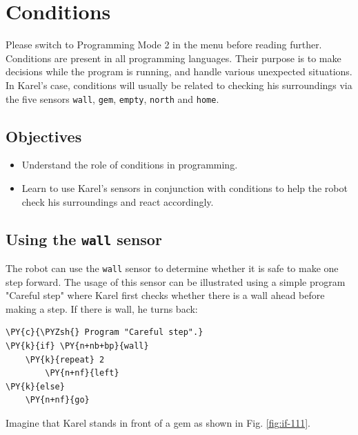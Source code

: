 
\section{Conditions} \label{sec:cond}

Please switch to Programming Mode 2 in the menu before reading further. Conditions 
are present in all programming languages. Their purpose is to make decisions while
the program is running, and handle various unexpected situations. In Karel's case, 
conditions will usually be related to checking his surroundings via the five sensors
{\tt wall}, {\tt gem}, {\tt empty}, {\tt north} and {\tt home}.

\subsection{Objectives} 

\begin{itemize}
\item Understand the role of conditions in programming.
\item Learn to use Karel's sensors in conjunction with conditions to help the robot
      check his surroundings and react accordingly. 
\end{itemize}

\subsection{Using the {\tt wall} sensor}

The robot can use the {\tt wall} sensor to determine 
whether it is safe to make one step forward.
The usage of this sensor can be illustrated 
using a simple program "Careful step" 
where Karel first checks whether there is a wall ahead before
making a step. If there is wall, he turns back:\\

\begin{bbox}
\begin{Verbatim}[commandchars=\\\{\}]
\PY{c}{\PYZsh{} Program "Careful step".}
\PY{k}{if} \PY{n+nb+bp}{wall}
    \PY{k}{repeat} 2
        \PY{n+nf}{left}
\PY{k}{else}
    \PY{n+nf}{go}
\end{Verbatim}
\end{bbox}
\vspace{6mm}

\noindent
Imagine that Karel stands in front of a gem as shown in Fig. \ref{fig:if-111}.
\newpage


